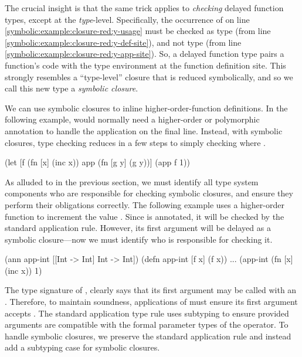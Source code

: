 The crucial insight is that
the same trick applies to \emph{checking} delayed function types,
except at the \emph{type}-level.
Specifically, the occurrence of 
on line \ref{symbolic:example:closure-red:y-usage}
must be checked as type  (from line \ref{symbolic:example:closure-red:y-def-site}),
and not type  (from line \ref{symbolic:example:closure-red:y-app-site}).
So, a delayed function type pairs a function's code with the type environment
at the function definition site.
This strongly resembles a ``type-level'' closure that is reduced symbolically,
and so we call this new type a \emph{symbolic closure}.

We can use symbolic closures to inline higher-order-function definitions.
In the following example,  would normally need a higher-order
or polymorphic
annotation to handle the application on the final line.
Instead, with symbolic closures, type checking reduces in a few steps to simply checking
 where .

\begin{cljlisting}
(let [f (fn [x] (inc x))
      app (fn [g y] (g y))]
  (app f 1))
\end{cljlisting}

As alluded to in the previous section, we must identify
all type system components who are responsible for checking symbolic closures,
and ensure they perform their obligations correctly.
The following example uses a higher-order function
 to increment the value .
Since  is annotated, it will be checked
by the standard application rule.
However, its first argument will be delayed as a symbolic
closure---now we must identify who is responsible for checking it.

\begin{cljlisting}
(ann app-int [[Int -> Int] Int -> Int])
(defn app-int [f x] (f x))
...
(app-int (fn [x] (inc x)) 1)
\end{cljlisting}

The type signature of ,
clearly says that its first argument may be called with an .
Therefore, to maintain soundness, applications of 
must ensure its first argument accepts .
The standard application type rule uses subtyping to ensure
provided arguments are compatible with the formal parameter types of
the operator.
To handle symbolic closures, we preserve the standard application rule
and instead add a subtyping case for symbolic closures.

